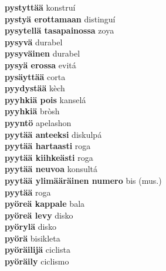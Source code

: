 \textbf{ pystyttää  } konstruí \\
\textbf{ pystyä erottamaan  } distinguí \\
\textbf{ pysytellä tasapainossa  } zoya \\
\textbf{ pysyvä  } durabel \\
\textbf{ pysyväinen  } durabel \\
\textbf{ pysyä erossa  } evitá \\
\textbf{ pysäyttää  } corta \\
\textbf{ pyydystää  } kèch \\
\textbf{ pyyhkiä pois  } kanselá \\
\textbf{ pyyhkiä  } bròsh \\
\textbf{ pyyntö  } apelashon \\
\textbf{ pyytää anteeksi  } diskulpá \\
\textbf{ pyytää hartaasti  } roga \\
\textbf{ pyytää kiihkeästi  } roga \\
\textbf{ pyytää neuvoa  } konsultá \\
\textbf{ pyytää ylimääräinen numero  } bis (mus.) \\
\textbf{ pyytää  } roga \\
\textbf{ pyöreä kappale  } bala \\
\textbf{ pyöreä levy  } disko \\
\textbf{ pyörylä  } disko \\
\textbf{ pyörä  } bisikleta \\
\textbf{ pyöräilijä  } ciclista \\
\textbf{ pyöräily  } ciclismo \\
